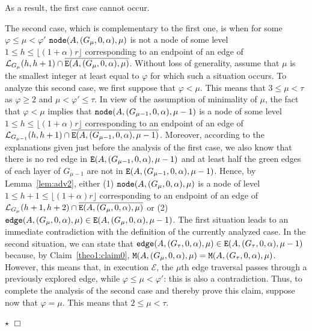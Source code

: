 \documentclass[11pt]{article}
\newcommand{\qed}{\hfill $\Box$ \bigbreak}
\newenvironment{proof}{\noindent {\bf Proof.}}{\qed}
\newenvironment{proofclaim}{\noindent{\bf Proof of the claim.}}{\hfill$\star$}
\begin{document}
{\begin{proof}
\begin{proofclaim}
As a result, the first case cannot occur.

The second case, which is complementary to the first one, is when for some $\varphi\leq\mu<\varphi'$ ${\tt node}(A,(G_{\mu},0,\alpha),\mu)$ is not a node of some level $1\leq h\leq\lfloor(1+\alpha)r\rfloor$ corresponding to an endpoint of an edge of $\mathcal{L}_{G_\mu}(h,h+1)\cap\overline{{\tt E}(A,(G_\mu,0,\alpha),\mu)}$. Without loss of generality, assume that $\mu$ is the smallest integer at least equal to $\varphi$ for which such a situation occurs. To analyze this second case, we first suppose that $\varphi<\mu$. This means that $3\leq\mu<\tau$ as $\varphi\geq2$ and $\mu<\varphi'\leq\tau$. In view of the assumption of minimality of $\mu$, the fact that $\varphi<\mu$ implies that ${\tt node}(A,(G_{\mu-1},0,\alpha),\mu-1)$ is a node of some level $1\leq h\leq\lfloor(1+\alpha)r\rfloor$ corresponding to an endpoint of an edge of $\mathcal{L}_{G_{\mu-1}}(h,h+1)\cap\overline{{\tt E}(A,(G_{\mu-1},0,\alpha),\mu-1)}$. Moreover, according to the explanations given just before the analysis of the first case, we also know that there is no red edge in ${\tt E}(A,(G_{\mu-1},0,\alpha),\mu-1)$ and at least half the green edges of each layer of $G_{\mu-1}$ are not in ${\tt E}(A,(G_{\mu-1},0,\alpha),\mu-1)$. Hence, by Lemma~\ref{lem:adv2}, either (1) ${\tt node}(A,(G_{\mu},0,\alpha),\mu)$ is a node of level $1\leq h+1\leq\lfloor(1+\alpha)r\rfloor$ corresponding to an endpoint of an edge of $\mathcal{L}_{G_\mu}(h+1,h+2)\cap\overline{{\tt E}(A,(G_\mu,0,\alpha),\mu)}$ or (2) ${\tt edge}(A,(G_{\mu},0,\alpha),\mu)\in{\tt E}(A,(G_{\mu},0,\alpha),\mu-1)$. The first situation leads to an immediate contradiction with the definition of the currently analyzed case. In the second situation, we can state that ${\tt edge}(A,(G_{\tau},0,\alpha),\mu)\in{\tt E}(A,(G_{\tau},0,\alpha),\mu-1)$ because, by Claim~\ref{theo1:claim0}, ${\tt M}(A,(G_{\mu},0,\alpha),\mu)={\tt M}(A,(G_\tau,0,\alpha),\mu)$. However, this means that, in execution $\mathcal{E}$, the $\mu$th edge traversal passes through a previously explored edge, while $\varphi\leq\mu<\varphi'$: this is also a contradiction. Thus, to complete the analysis of the second case and thereby prove this claim, suppose now that $\varphi=\mu$. This means that $2\leq\mu<\tau$.


\end{proofclaim}
\end{proof}}
\end{document}
